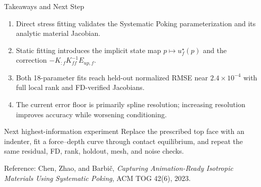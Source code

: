 \documentclass[aspectratio=169,10pt]{beamer}
\newcommand{\Kff}{K_{\!ff}}
\newcommand{\Eupf}{E_{up,f}}
\begin{document}
\begin{frame}{Takeaways and Next Step}
  \small
  \begin{enumerate}
    \item Direct stress fitting validates the Systematic Poking
      parameterization and its analytic material Jacobian.
    \item Static fitting introduces the implicit state map
      $p\mapsto u_f^\star(p)$ and the correction
      $-K_{:f}\Kff^{-1}\Eupf$.
    \item Both 18-parameter fits reach held-out normalized RMSE near
      $2.4\times10^{-4}$ with full local rank and FD-verified Jacobians.
    \item The current error floor is primarily spline resolution; increasing
      resolution improves accuracy while worsening conditioning.
  \end{enumerate}

  \vspace{0.5em}
  \begin{alertblock}{Next highest-information experiment}
    Replace the prescribed top face with an indenter, fit a force--depth
    curve through contact equilibrium, and repeat the same residual, FD,
    rank, holdout, mesh, and noise checks.
  \end{alertblock}

  \vfill
  \scriptsize
  Reference: Chen, Zhao, and Barbi\v{c},
  \emph{Capturing Animation-Ready Isotropic Materials Using Systematic Poking},
  ACM TOG 42(6), 2023.
\end{frame}
\end{document}
